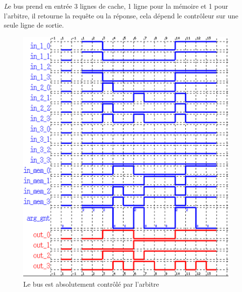 \documentclass[a4paper,11pt]{report}
\begin{document}
	{\huge \itshape L}e bus prend en entrée 3 lignes de cache, 1 ligne pour la mémoire et 1 pour l'arbitre, il retourne la requête ou la réponse, cela dépend le contrôleur sur une seule ligne de sortie.
	
	\begin{figure}[!htbp]	
		\includegraphics[width = 16cm]{bus_diag.png}
		\caption{Le bus est absolutement contrôlé par l'arbitre}
	\end{figure}
	
\end{document}
